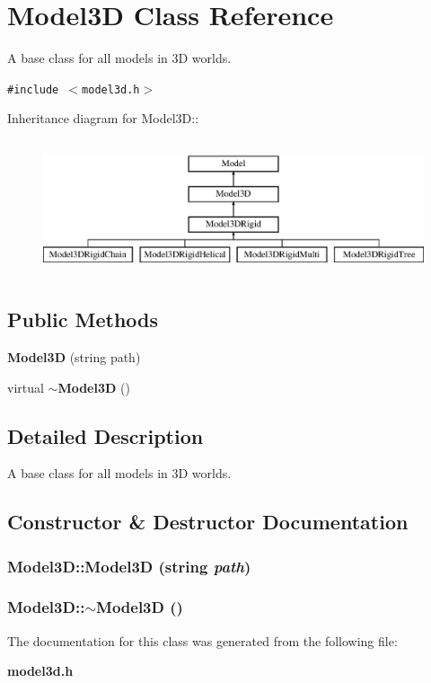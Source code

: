 \section{Model3D  Class Reference}
\label{class_Model3D}
A base class for all models in 3D worlds. 


{\tt \#include $<$model3d.h$>$}

Inheritance diagram for Model3D::\begin{figure}[H]
\begin{center}
\leavevmode
\includegraphics[height=4cm]{class_Model3D}
\end{center}
\end{figure}
\subsection*{Public Methods}
\begin{CompactItemize}
\item 
{\bf Model3D} (string path)
\item 
virtual {\bf $\sim$Model3D} ()
\end{CompactItemize}


\subsection{Detailed Description}
A base class for all models in 3D worlds.



\subsection{Constructor \& Destructor Documentation}
\subsubsection{\setlength{\rightskip}{0pt plus 5cm}Model3D::Model3D (string {\em path})}\label{class_Model3D_a0}


\subsubsection{\setlength{\rightskip}{0pt plus 5cm}Model3D::$\sim$Model3D ()\hspace{0.3cm}{\tt  [inline, virtual]}}\label{class_Model3D_a1}




The documentation for this class was generated from the following file:\begin{CompactItemize}
\item 
{\bf model3d.h}\end{CompactItemize}
